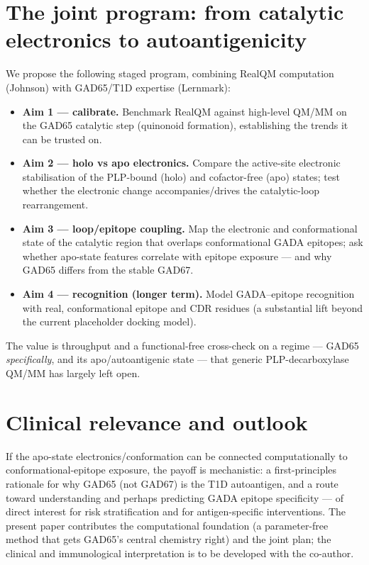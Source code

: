 \documentclass[11pt]{article}
\begin{document}
\section{The joint program: from catalytic electronics to autoantigenicity}
We propose the following staged program, combining RealQM computation (Johnson) with GAD65/T1D expertise
(Lernmark):
\begin{itemize}
\item \textbf{Aim 1 --- calibrate.} Benchmark RealQM against high-level QM/MM on the GAD65 catalytic step
(quinonoid formation), establishing the trends it can be trusted on.
\item \textbf{Aim 2 --- holo vs apo electronics.} Compare the active-site electronic stabilisation of the
PLP-bound (holo) and cofactor-free (apo) states; test whether the electronic change accompanies/drives the
catalytic-loop rearrangement.
\item \textbf{Aim 3 --- loop/epitope coupling.} Map the electronic and conformational state of the catalytic
region that overlaps conformational GADA epitopes; ask whether apo-state features correlate with epitope
exposure --- and why GAD65 differs from the stable GAD67.
\item \textbf{Aim 4 --- recognition (longer term).} Model GADA--epitope recognition with real, conformational
epitope and CDR residues (a substantial lift beyond the current placeholder docking model).
\end{itemize}
The value is throughput and a functional-free cross-check on a regime --- GAD65 \emph{specifically}, and its
apo/autoantigenic state --- that generic PLP-decarboxylase QM/MM has largely left open.

\section{Clinical relevance and outlook}
If the apo-state electronics/conformation can be connected computationally to conformational-epitope exposure,
the payoff is mechanistic: a first-principles rationale for why GAD65 (not GAD67) is the T1D autoantigen, and
a route toward understanding and perhaps predicting GADA epitope specificity --- of direct interest for risk
stratification and for antigen-specific interventions. The present paper contributes the computational
foundation (a parameter-free method that gets GAD65's central chemistry right) and the joint plan; the clinical
and immunological interpretation is to be developed with the co-author.
\end{document}
